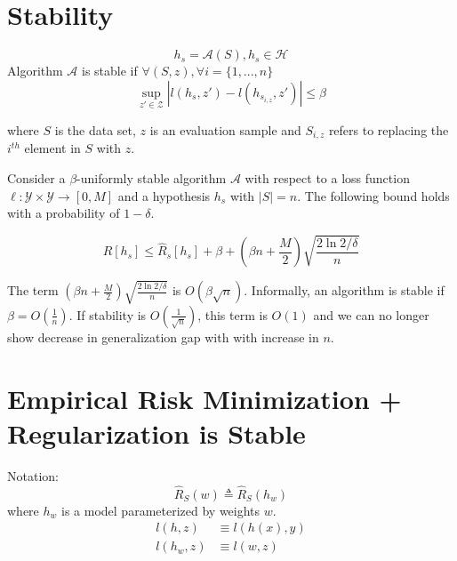 \documentclass{article}
\begin{document}
\section*{Stability}
\begin{defn}
\[
h_s = \mathcal{A}(S), h_s\in\mathcal{H}
\]
Algorithm $\mathcal{A}$ is stable if $\forall (S, z), \forall i=\{1,...,n\}$
\[
\sup_{z'\in\mathcal{Z}}|l(h_s, z') - l(h_{s_{i,z}}, z')| \leq \beta
\]

\noindent where $S$ is the data set, $z$ is an evaluation sample and $S_{i,z}$ refers to replacing the $i^{th}$ element in $S$ with $z$.  
\end{defn}



\begin{thm}
Consider a $\beta$-uniformly stable algorithm $\mathcal{A}$ with respect to a loss function $\ell : \mathcal{Y} \times \mathcal{Y} \rightarrow [0, M]$ and a hypothesis $h_s$ with $|S|=n$. The following bound holds with a probability of $1-\delta$.

\[
R[h_s]\leq\hat{R}_s[h_s] + \beta  + (\beta n + \frac{M}{2})\sqrt{\frac{2\ln{2/\delta}}{n}}
\]
\end{thm}

The term $(\beta n + \frac{M}{2})\sqrt{\frac{2\ln{2/\delta}}{n}}$ is $O(\beta\sqrt{n})$. Informally, an algorithm is stable if $\beta=O(\frac{1}{n})$. If stability is $O(\frac{1}{\sqrt{n}})$, this term is $O(1)$ and we can no longer show decrease in generalization gap with with increase in $n$.

\section*{Empirical Risk Minimization + Regularization is Stable}
Notation: 
$$\hat{R}_S(w) \triangleq \hat{R}_S(h_w)$$ where $h_w$ is a model parameterized by weights $w$.
\begin{align*}
    l(h,z)&\equiv l(h(x), y) \\
    l(h_w, z) &\equiv l(w,z)
\end{align*}
\end{document}
